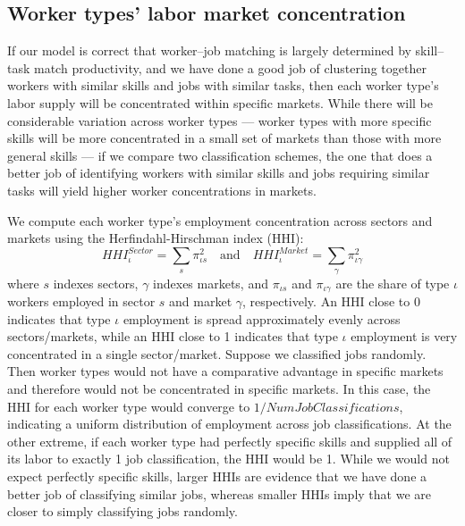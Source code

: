 \documentclass[12pt]{article}
\def\g{\gamma}
\def\i{\iota}
\theoremstyle{definition}
\theoremstyle{plain}
\begin{document}
\subsection{Worker types' labor market concentration}


\label{sec:hhi}

If our model is correct that worker--job matching is largely determined by skill--task match productivity, and we have done a good job of clustering together workers with similar skills and jobs with similar tasks, then each worker type's labor supply will be concentrated within specific markets. While there will be considerable variation across worker types --- worker types with more specific skills will be more concentrated in a small set of markets than those with more general skills --- if we compare two classification schemes, the one that does a better job of identifying workers with similar skills and jobs requiring similar tasks will yield higher worker concentrations in markets.


We compute each worker type's employment concentration across sectors and markets using the Herfindahl-Hirschman index (HHI): 
\[ HHI_{\i}^{Sector} = \sum_s \pi_{\i s}^2 \quad \text{and} \quad  HHI_{\i}^{Market} = \sum_\g \pi_{\i \g}^2 \]
where $s$ indexes sectors, $\g$ indexes markets, and $\pi_{\i s}$ and $\pi_{\i \g}$ are the share of type $\i$ workers employed in sector $s$ and market $\g$, respectively. An HHI close to 0 indicates that type $\i$ employment is spread approximately evenly across sectors/markets, while an HHI close to 1 indicates that type $\i$ employment is very concentrated in a single sector/market. Suppose we classified jobs randomly. Then worker types would not have a comparative advantage in specific markets and therefore would not be concentrated in specific markets. In this case, the HHI for each worker type would converge to $1/NumJobClassifications$, indicating a uniform distribution of employment across job classifications. At the other extreme, if each worker type had perfectly specific skills and supplied all of its labor to exactly 1 job classification, the HHI would be 1. While we would not expect perfectly specific skills,  larger HHIs are evidence that we have done a better job of classifying similar jobs, whereas smaller HHIs imply that we are closer to simply classifying jobs randomly. 
\end{document}
